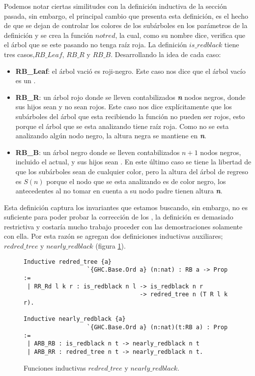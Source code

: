 Podemos notar ciertas similitudes con la definición inductiva de la secci\'on pasada, sin
embargo, el principal cambio que presenta esta definición, es el hecho de que se dejan de controlar
los colores de los subárboles en los parámetros de la definici\'on y se crea la funci\'on $notred$,
la cual, como su nombre dice, verifica que el \'arbol que se este pasando no tenga raíz roja. La
definici\'on $is\_redblack$ tiene tres casos,$RB\_Leaf$, $RB\_R$ y $RB\_B$. Desarrollando la idea de cada caso:

\begin{itemize}
        \item \textbf{RB\_Leaf}: el árbol vació es roji-negro. Este caso nos dice que el \'arbol
        vacío es un {\arn}.
        \item \textbf{RB\_R}: un árbol rojo donde se lleven contabilizados \textbf{\textit{n}} nodos negros, donde sus
        hijos sean {\arns} y no sean rojos. Este caso nos dice explícitamente que los subárboles
        del árbol que esta recibiendo la función no pueden ser rojos, esto porque el árbol que se
        esta analizando tiene raíz roja. Como no se esta analizando algún nodo negro, la altura
        negra se mantiene en \textbf{\textit{n}}.
        \item \textbf{RB\_B}: un árbol negro donde se lleven contabilizados $n+1$ nodos negros, incluido
        el actual, y sus hijos sean {\arns}. En este \'ultimo caso se tiene la libertad de que los
        subárboles sean de cualquier color, pero la altura del \'arbol de regreso es $S(n)$ porque el nodo
        que se esta analizando es de color negro, los antecedentes al no tomar en cuenta a su nodo
        padre tienen altura \textbf{\textit{n}}.
\end{itemize}

Esta definici\'on captura los invariantes que estamos buscando, sin embargo, no es suficiente para
poder probar la correcci\'on de los {\arns}, la definici\'on es demasiado restrictiva y costaría mucho
trabajo proceder con las demostraciones solamente con ella. Por esta razón se agregan dos
definiciones inductivas auxiliares; $redred\_tree$ y $nearly\_redblack$ (figura \ref{inductive_aux}).

\begin{figure}[!ht]
\centering
\captionsetup{justification=centering}
\begin{verbatim}
Inductive redred_tree {a}
                  `{GHC.Base.Ord a} (n:nat) : RB a -> Prop :=
 | RR_Rd l k r : is_redblack n l -> is_redblack n r
                                 -> redred_tree n (T R l k r).

Inductive nearly_redblack {a}
                  `{GHC.Base.Ord a} (n:nat)(t:RB a) : Prop :=
 | ARB_RB : is_redblack n t -> nearly_redblack n t
 | ARB_RR : redred_tree n t -> nearly_redblack n t.
\end{verbatim}
\caption{Funciones inductivas $redred\_tree$ y $nearly\_redblack$.}
\label{inductive_aux}
\end{figure}

